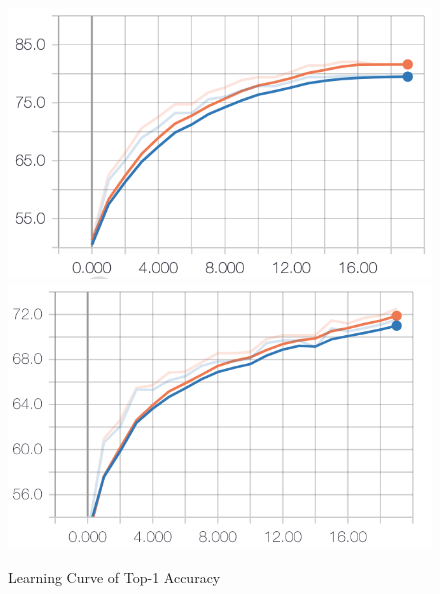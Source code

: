 \documentclass{article}
\begin{document}
\begin{figure}[h]
  \centering
  \includegraphics[scale=0.7]{top_1_acc_sc.png}
  \includegraphics[scale=0.7]{top_1_acc_pre.png}
  \caption{Learning Curve of Top-1 Accuracy}
\end{figure}
\end{document}
